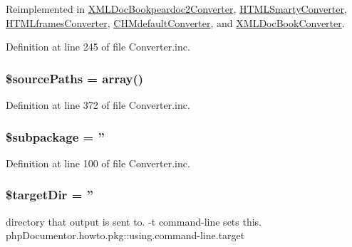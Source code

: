 \-Reimplemented in \hyperlink{class_x_m_l_doc_bookpeardoc2_converter_ab5dae87e1968b35e37687a763216a835}{\-X\-M\-L\-Doc\-Bookpeardoc2\-Converter}, \hyperlink{class_h_t_m_l_smarty_converter_ab5dae87e1968b35e37687a763216a835}{\-H\-T\-M\-L\-Smarty\-Converter}, \hyperlink{class_h_t_m_lframes_converter_ab5dae87e1968b35e37687a763216a835}{\-H\-T\-M\-Lframes\-Converter}, \hyperlink{class_c_h_mdefault_converter_ab5dae87e1968b35e37687a763216a835}{\-C\-H\-Mdefault\-Converter}, and \hyperlink{class_x_m_l_doc_book_converter_ab5dae87e1968b35e37687a763216a835}{\-X\-M\-L\-Doc\-Book\-Converter}.



\-Definition at line 245 of file \-Converter.\-inc.

\hypertarget{class_converter_acd2528ea280de1205493ed612957c799}{
\subsubsection[{\$source\-Paths}]{\setlength{\rightskip}{0pt plus 5cm}\$source\-Paths = array()}}\label{class_converter_acd2528ea280de1205493ed612957c799}


\-Definition at line 372 of file \-Converter.\-inc.

\hypertarget{class_converter_ac601dc8dc2a086b6381128cc9c7a3fc5}{
\subsubsection[{\$subpackage}]{\setlength{\rightskip}{0pt plus 5cm}\$subpackage = ''}}\label{class_converter_ac601dc8dc2a086b6381128cc9c7a3fc5}


\-Definition at line 100 of file \-Converter.\-inc.

\hypertarget{class_converter_aae33ae3051c6f350bb69a0631ade81d9}{
\subsubsection[{\$target\-Dir}]{\setlength{\rightskip}{0pt plus 5cm}\$target\-Dir = ''}}\label{class_converter_aae33ae3051c6f350bb69a0631ade81d9}
directory that output is sent to. -\/t command-\/line sets this.  php\-Documentor.\-howto.\-pkg\-::using.\-command-\/line.\-target 


